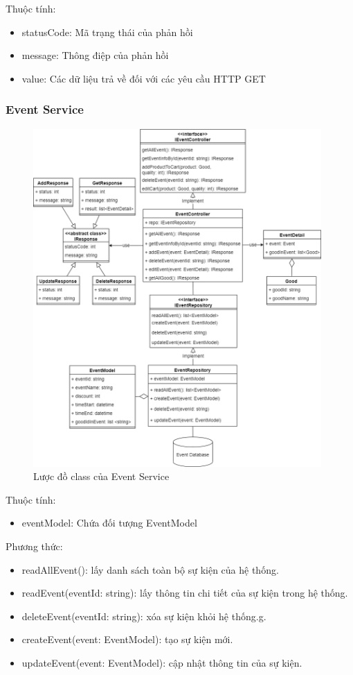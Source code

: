 Thuộc tính:
\begin{itemize}
	\item statusCode: Mã trạng thái của phản hồi
	\item message: Thông điệp của phản hồi
	\item value: Các dữ liệu trả về đối với các yêu cầu HTTP GET
\end{itemize}


\subsubsection{Event Service}
\begin{figure}[!htp]
	\centering
	\includegraphics[width=11cm]{img/Architecture/service/EventService.png}
	\newline
	\caption{Lược đồ class của Event Service}
\end{figure}

Thuộc tính:
\begin{itemize}
	\item eventModel: Chứa đối tượng EventModel
\end{itemize}
Phương thức:
\begin{itemize}
	\item readAllEvent(): lấy danh sách toàn bộ sự kiện của hệ thống.
	\item readEvent(eventId: string): lấy thông tin chi tiết của sự kiện trong hệ thống.
	\item deleteEvent(eventId: string): xóa sự kiện khỏi hệ thống.g.
	\item createEvent(event: EventModel): tạo sự kiện mới.
	\item updateEvent(event: EventModel): cập nhật thông tin của sự kiện.
\end{itemize}

